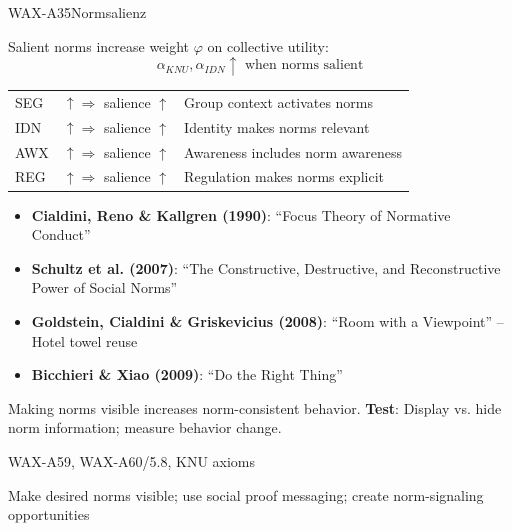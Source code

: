 \begin{axiomspec}{WAX-A35}{Normsalienz}

Salient norms increase weight $\varphi$ on collective utility:
\begin{equation}
\alpha_{KNU}, \alpha_{IDN} \uparrow \text{ when norms salient}
\end{equation}

\begin{tabular}{lll}
SEG & $\uparrow \Rightarrow$ salience $\uparrow$ & Group context activates norms \\
IDN & $\uparrow \Rightarrow$ salience $\uparrow$ & Identity makes norms relevant \\
AWX & $\uparrow \Rightarrow$ salience $\uparrow$ & Awareness includes norm awareness \\
REG & $\uparrow \Rightarrow$ salience $\uparrow$ & Regulation makes norms explicit \\
\end{tabular}

\begin{itemize}
\item \textbf{Cialdini, Reno \& Kallgren (1990)}: ``Focus Theory of Normative Conduct''
\item \textbf{Schultz et al. (2007)}: ``The Constructive, Destructive, and Reconstructive Power of Social Norms''
\item \textbf{Goldstein, Cialdini \& Griskevicius (2008)}: ``Room with a Viewpoint'' -- Hotel towel reuse
\item \textbf{Bicchieri \& Xiao (2009)}: ``Do the Right Thing''
\end{itemize}

Making norms visible increases norm-consistent behavior.
\textbf{Test}: Display vs. hide norm information; measure behavior change.

WAX-A59, WAX-A60/5.8, KNU axioms

Make desired norms visible; use social proof messaging; create norm-signaling opportunities

\end{axiomspec}


